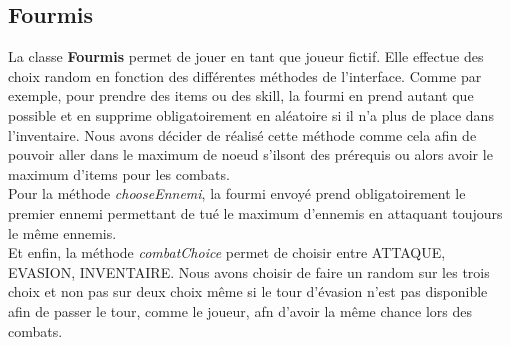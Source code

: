 	\subsection{Fourmis}
		La classe \textbf{Fourmis} permet de jouer en tant que joueur fictif. Elle effectue des choix random en fonction des différentes méthodes de l'interface.
		Comme par exemple, pour prendre des items ou des skill, la fourmi en prend autant que possible et en supprime obligatoirement en aléatoire si il n'a plus de place dans l'inventaire. Nous avons décider de réalisé cette méthode comme cela afin de pouvoir aller dans le maximum de noeud s'ilsont des prérequis ou alors avoir le maximum d'items pour les combats.\\
		Pour la méthode \textit{chooseEnnemi}, la fourmi envoyé prend obligatoirement le premier ennemi permettant de tué le maximum d'ennemis en attaquant toujours le même ennemis.\\
		Et enfin, la méthode \textit{combatChoice} permet de choisir entre ATTAQUE, EVASION, INVENTAIRE. Nous avons choisir de faire un random sur les trois choix et non pas sur deux choix même si le tour d'évasion n'est pas disponible afin de passer le tour, comme le joueur, afn d'avoir la même chance lors des combats.\\

